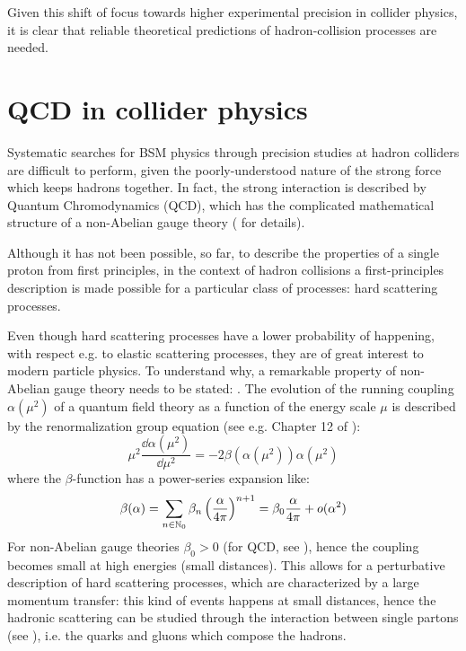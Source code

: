 Given this shift of focus towards higher experimental precision in collider physics, it is clear that reliable theoretical predictions of hadron-collision processes are needed.

\section{QCD in collider physics}

Systematic searches for BSM physics through precision studies at hadron colliders are difficult to perform, given the poorly-understood nature of the strong force which keeps hadrons together. In fact, the strong interaction is described by Quantum Chromodynamics (QCD), which has the complicated mathematical structure of a non-Abelian gauge theory ( for details).

Although it has not been possible, so far, to describe the properties of a single proton from first principles, in the context of hadron collisions a first-principles description is made possible for a particular class of processes: hard scattering processes.

Even though hard scattering processes have a lower probability of happening, with respect e.g. to elastic scattering processes, they are of great interest to modern particle physics. To understand why, a remarkable property of non-Abelian gauge theory needs to be stated: . The evolution of the running coupling $ \alpha(\mu^2) $ of a quantum field theory as a function of the energy scale $ \mu $ is described by the renormalization group equation (see e.g. Chapter 12 of \cite{Peskin-1995}):
\begin{equation}
  \mu^2 \frac{\dd \alpha(\mu^2)}{\dd \mu^2} = - 2 \beta(\alpha(\mu^2)) \alpha(\mu^2)
  \label{eq:ren-gr}
\end{equation}
where the $ \beta $-function has a power-series expansion like:
\begin{equation}
  \beta(\alpha) = \sum_{n \in \mathbb{N}_0} \beta_n \left( \frac{\alpha}{4\pi} \right)^{n+1} = \beta_0 \frac{\alpha}{4\pi} + o(\alpha^2)
  \label{eq:beta-func}
\end{equation}
For non-Abelian gauge theories $ \beta_0 > 0 $ (for QCD, see \cite{Gross-1973, Politzer-1973}), hence the coupling becomes small at high energies (small distances). This allows for a perturbative description of hard scattering processes, which are characterized by a large momentum transfer: this kind of events happens at small distances, hence the hadronic scattering can be studied through the interaction between single partons (see ), i.e. the quarks and gluons which compose the hadrons.

